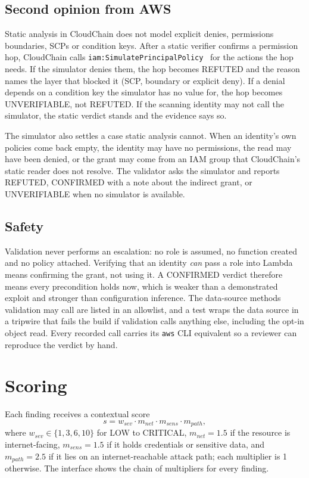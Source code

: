 \documentclass[conference]{IEEEtran}
\begin{document}
\subsection{Second opinion from AWS}
Static analysis in CloudChain does not model explicit denies, permissions boundaries, SCPs or condition keys. After a static verifier confirms a permission hop, CloudChain calls \texttt{iam:SimulatePrincipalPolicy}~\cite{awssim} for the actions the hop needs. If the simulator denies them, the hop becomes REFUTED and the reason names the layer that blocked it (SCP, boundary or explicit deny). If a denial depends on a condition key the simulator has no value for, the hop becomes UNVERIFIABLE, not REFUTED. If the scanning identity may not call the simulator, the static verdict stands and the evidence says so.

The simulator also settles a case static analysis cannot. When an identity's own policies come back empty, the identity may have no permissions, the read may have been denied, or the grant may come from an IAM group that CloudChain's static reader does not resolve. The validator asks the simulator and reports REFUTED, CONFIRMED with a note about the indirect grant, or UNVERIFIABLE when no simulator is available.

\subsection{Safety}
Validation never performs an escalation: no role is assumed, no function created and no policy attached. Verifying that an identity \textit{can} pass a role into Lambda means confirming the grant, not using it. A CONFIRMED verdict therefore means every precondition holds now, which is weaker than a demonstrated exploit and stronger than configuration inference. The data-source methods validation may call are listed in an allowlist, and a test wraps the data source in a tripwire that fails the build if validation calls anything else, including the opt-in object read. Every recorded call carries its \texttt{aws} CLI equivalent so a reviewer can reproduce the verdict by hand.

\section{Scoring}\label{sec:scoring}

Each finding receives a contextual score
\begin{equation}
s = w_{\mathit{sev}} \cdot m_{\mathit{net}} \cdot m_{\mathit{sens}} \cdot m_{\mathit{path}},
\end{equation}
where $w_{\mathit{sev}} \in \{1, 3, 6, 10\}$ for LOW to CRITICAL, $m_{\mathit{net}} = 1.5$ if the resource is internet-facing, $m_{\mathit{sens}} = 1.5$ if it holds credentials or sensitive data, and $m_{\mathit{path}} = 2.5$ if it lies on an internet-reachable attack path; each multiplier is 1 otherwise. The interface shows the chain of multipliers for every finding.
\end{document}
